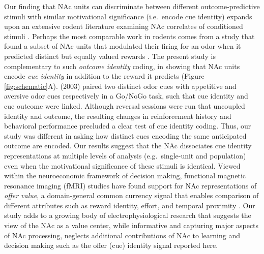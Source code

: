 \documentclass[11pt]{article}
\let\cite=\citep
\begin{document}
Our finding that NAc units can discriminate between different
outcome-predictive stimuli with similar motivational significance
(i.e.\ encode cue identity) expands upon an extensive rodent
literature examining NAc correlates of conditioned stimuli
\cite{Setlow2003,Nicola2004,Yun2004,Roitman2005,Day2006,Ambroggi2008,Ishikawa2008,Roesch2009a,Saddoris2011,Goldstein2012,Lansink2012,Bissonette2013,McGinty2013,Atallah2014,Sugam2014,Cooch2015,West2016,Dejean2017}. Perhaps
the most comparable work in rodents comes from a study that found a
subset of NAc units that modulated their firing for an odor when it
predicted distinct but equally valued rewards \cite{Cooch2015}. The
present study is complementary to such {\it outcome identity} coding,
in showing that NAc units encode {\it cue identity} in addition to the
reward it predicts (Figure
\ref{fig:schematic}A). \citeauthor{Setlow2003} (2003) paired two distinct
odor cues with appetitive and aversive odor cues respectively in a
Go/NoGo task, such that cue identity and cue outcome were
linked. Although reversal sessions were run that uncoupled identity
and outcome, the resulting changes in reinforcement history and
behavioral performance precluded a clear test of cue identity
coding. Thus, our study was different in asking how distinct cues
encoding the same anticipated outcome are encoded. Our results suggest
that the NAc dissociates cue identity representations at multiple
levels of analysis (e.g.\ single-unit and population) even when the
motivational significance of these stimuli is identical. Viewed within
the neuroeconomic framework of decision making, functional magnetic
resonance imaging (fMRI) studies have found support for NAc
representations of {\it offer value}, a domain-general common currency
signal that enables comparison of different attributes such as reward
identity, effort, and temporal proximity
\cite{Peters2009,Levy2012,Bartra2013,Sescousse2015}. Our study adds to
a growing body of electrophysiological research that suggests the view
of the NAc as a value center, while informative and capturing major
aspects of NAc processing, neglects additional contributions of NAc to
learning and decision making such as the offer (cue) identity signal
reported here.
\end{document}
